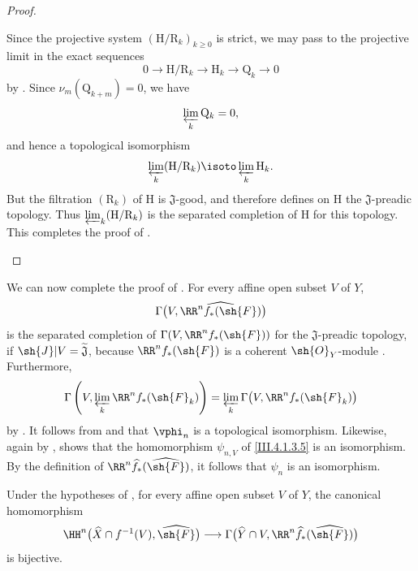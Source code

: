 \begin{proof}
\begin{env}[4.1.7.21]
Since the projective system
$(\mathrm{H}/\mathrm{R}_k)_{k\geq0}$ is strict, we may pass to the
projective limit in the exact sequences
\[
  0
  \longrightarrow
  \mathrm{H}/\mathrm{R}_k
  \longrightarrow
  \mathrm{H}_k
  \longrightarrow
  \mathrm{Q}_k
  \longrightarrow
  0
  \tag{4.1.7.22}
  \label{III.4.1.7.22}
\]
by .
Since $\nu_m(\mathrm{Q}_{k+m})=0$, we have
\[
  \varprojlim_k\mathrm{Q}_k=0,
\]
and hence a topological isomorphism
\[
  \varprojlim_k(\mathrm{H}/\mathrm{R}_k)
  \isoto
  \varprojlim_k\mathrm{H}_k.
\]
But the filtration $(\mathrm{R}_k)$ of $\mathrm{H}$ is
$\mathfrak{J}$-good, and therefore defines on $\mathrm{H}$ the
$\mathfrak{J}$-preadic topology.
Thus $\varprojlim_k(\mathrm{H}/\mathrm{R}_k)$ is the separated
completion of $\mathrm{H}$ for this topology.
This completes the proof of .
\end{env}
\end{proof}

\begin{env}[4.1.8]
\label{III.4.1.8}
We can now complete the proof of .
For every affine open subset $V$ of $Y$,
\[
  \Gamma\bigl(
    V,\widehat{\RR^n f_*(\sh{F})}
  \bigr)
\]
is the separated completion of
$\Gamma(V,\RR^n f_*(\sh{F}))$ for the
$\mathfrak{J}$-preadic topology, if
$\sh{J}|V=\widetilde{\mathfrak{J}}$, because
$\RR^n f_*(\sh{F})$ is a coherent $\sh{O}_Y$-module
.
Furthermore,
\[
  \Gamma\left(
    V,\varprojlim_k\RR^n f_*(\sh{F}_k)
  \right)
  =
  \varprojlim_k
  \Gamma\bigl(V,\RR^n f_*(\sh{F}_k)\bigr)
\]
by .
It follows from  and  that
$\vphi_n$ is a topological isomorphism.
Likewise, again by ,  shows that the
homomorphism $\psi_{n,V}$ of \eqref{III.4.1.3.5} is an isomorphism.
By the definition of
$\RR^n\widehat{f}_*(\widehat{\sh{F}})$, it follows that $\psi_n$ is
an isomorphism.
\end{env}

\begin{corollary}[4.1.9]
\label{III.4.1.9}
Under the hypotheses of , for every affine open
subset $V$ of $Y$, the canonical homomorphism
\[
  \HH^n\bigl(
    \widehat{X}\cap f^{-1}(V),
    \widehat{\sh{F}}
  \bigr)
  \longrightarrow
  \Gamma\bigl(
    \widehat{Y}\cap V,
    \RR^n\widehat{f}_*(\widehat{\sh{F}})
  \bigr)
\]
is bijective.
\end{corollary}

